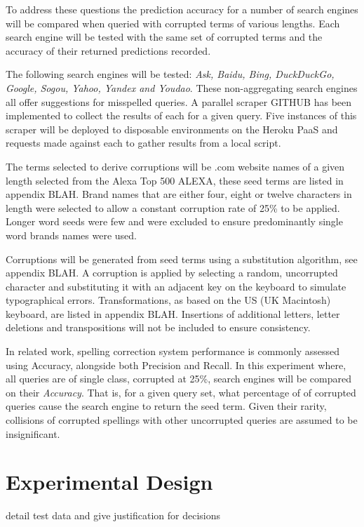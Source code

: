 \documentclass{csfourzero}
\begin{document}
To address these questions the prediction accuracy for a number of search engines will be compared when queried with corrupted terms of various lengths. Each search engine will be tested with the same set of corrupted terms and the accuracy of their returned predictions recorded.

The following search engines will be tested: \textit{Ask, Baidu, Bing, DuckDuckGo, Google, Sogou, Yahoo, Yandex and Youdao}. These non-aggregating search engines all offer suggestions for misspelled queries. A parallel scraper GITHUB has been implemented to collect the results of each for a given query. Five instances of this scraper will be deployed to disposable environments on the Heroku PaaS and requests made against each to gather results from a local script.

The terms selected to derive corruptions will be .com website names of a given length selected from the Alexa Top 500 ALEXA, these seed terms are listed in appendix BLAH. Brand names that are either four, eight or twelve characters in length were selected to allow a constant corruption rate of 25\% to be applied. Longer word seeds were few and were excluded to ensure predominantly single word brands names were used.

Corruptions will be generated from seed terms using a substitution algorithm, see appendix BLAH. A corruption is applied by selecting a random, uncorrupted character and substituting it with an adjacent key on the keyboard to simulate typographical errors. Transformations, as based on the US (UK Macintosh) keyboard, are listed in appendix BLAH. Insertions of additional letters, letter deletions and transpositions will not be included to ensure consistency.

In related work, spelling correction system performance is commonly assessed using Accuracy, alongside both Precision and Recall. In this experiment where, all queries are of single class, corrupted at 25\%, search engines will be compared on their \textit{Accuracy}. That is, for a given query set, what percentage of of corrupted queries cause the search engine to return the seed term. Given their rarity, collisions of corrupted spellings with other uncorrupted queries are assumed to be insignificant.

\section{Experimental Design}
\label{sec:exp}

detail test data and give justification for decisions
\end{document}

